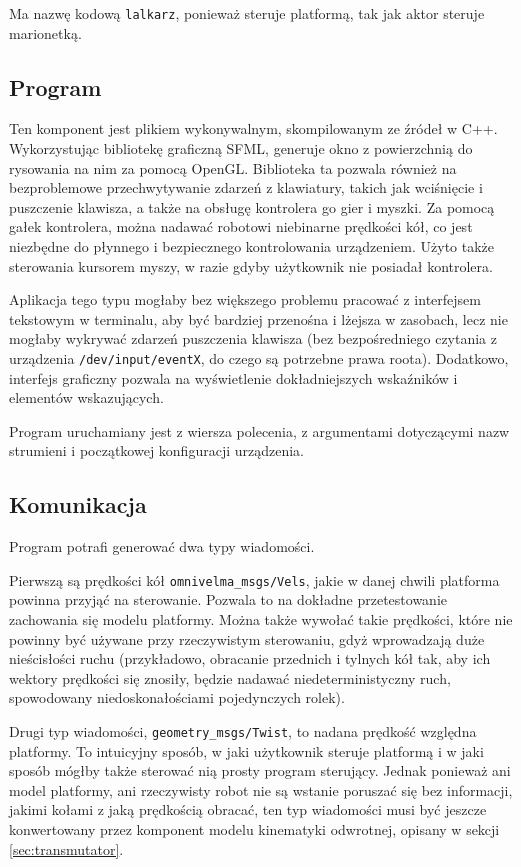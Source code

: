 	Ma nazwę kodową \texttt{lalkarz}, ponieważ steruje platformą, tak jak aktor steruje marionetką.
	
	\subsection{Program}
		Ten komponent jest plikiem wykonywalnym, skompilowanym ze źródeł w C++.
		Wykorzystując bibliotekę graficzną SFML, generuje okno z powierzchnią do rysowania na nim za pomocą OpenGL.
		Biblioteka ta pozwala również na bezproblemowe przechwytywanie zdarzeń z klawiatury, takich jak wciśnięcie i puszczenie klawisza, a także na obsługę kontrolera go gier i myszki.
		Za pomocą gałek kontrolera, można nadawać robotowi niebinarne prędkości kół, co jest niezbędne do płynnego i bezpiecznego kontrolowania urządzeniem.
		Użyto także sterowania kursorem myszy, w razie gdyby użytkownik nie posiadał kontrolera.
		
		Aplikacja tego typu mogłaby bez większego problemu pracować z interfejsem tekstowym w terminalu, aby być bardziej przenośna i lżejsza w zasobach, 
		lecz nie mogłaby wykrywać zdarzeń puszczenia klawisza
		(bez bezpośredniego czytania z urządzenia \texttt{/dev/input/eventX}, do czego są potrzebne prawa roota). 
		Dodatkowo, interfejs graficzny pozwala na wyświetlenie dokładniejszych wskaźników i elementów wskazujących.
		
		Program uruchamiany jest z wiersza polecenia, z argumentami dotyczącymi nazw strumieni i początkowej konfiguracji urządzenia.
	
	\subsection{Komunikacja}
		Program potrafi generować dwa typy wiadomości.
		
		Pierwszą są prędkości kół \texttt{omnivelma\_msgs/Vels}, jakie w danej chwili platforma powinna przyjąć na sterowanie.
		Pozwala to na dokładne przetestowanie zachowania się modelu platformy.
		Można także wywołać takie prędkości, które nie powinny być używane przy rzeczywistym sterowaniu, gdyż wprowadzają duże nieścisłości ruchu 
		(przykładowo, obracanie przednich i tylnych kół tak, aby ich wektory prędkości się znosiły, będzie nadawać niedeterministyczny ruch, spowodowany niedoskonałościami
		pojedynczych rolek).
		
		Drugi typ wiadomości, \texttt{geometry\_msgs/Twist}, to nadana prędkość względna platformy.
		To intuicyjny sposób, w jaki użytkownik steruje platformą i w jaki sposób mógłby także sterować nią prosty program sterujący.
		Jednak ponieważ ani model platformy, ani rzeczywisty robot nie są wstanie poruszać się bez informacji, jakimi kołami z jaką prędkością obracać,
		ten typ wiadomości musi być jeszcze konwertowany przez komponent modelu kinematyki odwrotnej, opisany w sekcji \ref{sec:transmutator}.
		
